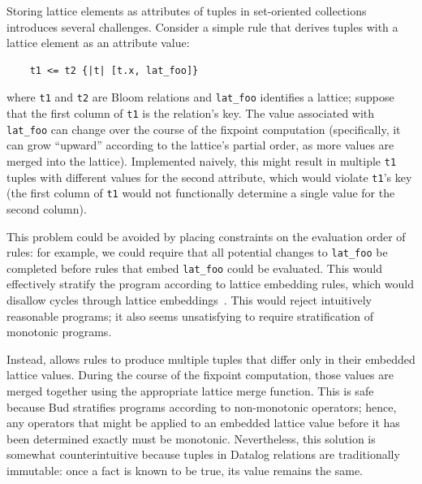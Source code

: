 Storing lattice elements as attributes of tuples in set-oriented collections
introduces several challenges. Consider a simple \lang rule that derives tuples
with a lattice element as an attribute value:
\begin{verbatim}
    t1 <= t2 {|t| [t.x, lat_foo]}
\end{verbatim}
where \texttt{t1} and \texttt{t2} are Bloom relations and \texttt{lat\_foo}
identifies a lattice; suppose that the first column of \texttt{t1} is the
relation's key. The value associated with \texttt{lat\_foo} can change over the
course of the fixpoint computation (specifically, it can grow ``upward''
according to the lattice's partial order, as more values are merged into the
lattice). Implemented naively, this might result in multiple \texttt{t1} tuples
with different values for the second attribute, which would violate
\texttt{t1}'s key (the first column of \texttt{t1} would not functionally
determine a single value for the second column).

This problem could be avoided by placing constraints on the evaluation order of
rules: for example, we could require that all potential changes to
\texttt{lat\_foo} be completed before rules that embed \texttt{lat\_foo} could
be evaluated. This would effectively stratify the program according to lattice
embedding rules, which would disallow cycles through lattice
embeddings~\cite{Apt1988}. This would reject intuitively reasonable programs; it
also seems unsatisfying to require stratification of monotonic programs.

Instead, \lang allows rules to produce multiple tuples that differ only in their
embedded lattice values. During the course of the fixpoint computation, those
values are merged together using the appropriate lattice merge function. This is
safe because Bud stratifies programs according to non-monotonic operators;
hence, any operators that might be applied to an embedded lattice value before
it has been determined exactly must be monotonic. Nevertheless, this solution is
somewhat counterintuitive because tuples in Datalog relations are traditionally
immutable: once a fact is known to be true, its value remains the
same.%

